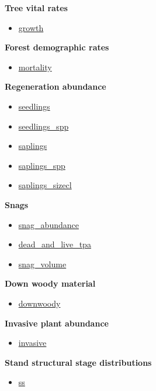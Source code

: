\documentclass[
]{book}
\providecommand{\tightlist}{%
  \setlength{\itemsep}{0pt}\setlength{\parskip}{0pt}}
\begin{document}
\textbf{Tree vital rates}

\begin{itemize}
\tightlist
\item
  \protect\hyperlink{growth}{growth}
\end{itemize}

\textbf{Forest demographic rates}

\begin{itemize}
\tightlist
\item
  \protect\hyperlink{mortality}{mortality}
\end{itemize}

\textbf{Regeneration abundance}

\begin{itemize}
\tightlist
\item
  \protect\hyperlink{seedlings}{seedlings}
\item
  \protect\hyperlink{seedlings_spp}{seedlings\_spp}
\item
  \protect\hyperlink{saplings}{saplings}
\item
  \protect\hyperlink{saplings_spp}{saplings\_spp}
\item
  \protect\hyperlink{saplings_sizecl}{saplings\_sizecl}
\end{itemize}

\textbf{Snags}

\begin{itemize}
\tightlist
\item
  \protect\hyperlink{snag_abundance}{snag\_abundance}
\item
  \protect\hyperlink{dead_and_live_tpa}{dead\_and\_live\_tpa}
\item
  \protect\hyperlink{snag_volume}{snag\_volume}
\end{itemize}

\textbf{Down woody material}

\begin{itemize}
\tightlist
\item
  \protect\hyperlink{downwoody}{downwoody}
\end{itemize}

\textbf{Invasive plant abundance}

\begin{itemize}
\tightlist
\item
  \protect\hyperlink{invasive}{invasive}
\end{itemize}

\textbf{Stand structural stage distributions}

\begin{itemize}
\tightlist
\item
  \protect\hyperlink{ss}{ss}
\end{itemize}
\end{document}
